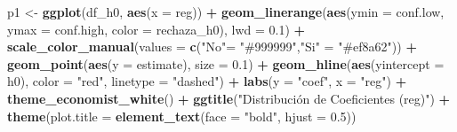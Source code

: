 \documentclass[
]{article}
\newenvironment{Shaded}{\begin{snugshade}}{\end{snugshade}}
\newcommand{\AttributeTok}[1]{\textcolor[rgb]{0.13,0.29,0.53}{#1}}
\newcommand{\FloatTok}[1]{\textcolor[rgb]{0.00,0.00,0.81}{#1}}
\newcommand{\FunctionTok}[1]{\textcolor[rgb]{0.13,0.29,0.53}{\textbf{#1}}}
\newcommand{\NormalTok}[1]{#1}
\newcommand{\OtherTok}[1]{\textcolor[rgb]{0.56,0.35,0.01}{#1}}
\newcommand{\SpecialCharTok}[1]{\textcolor[rgb]{0.81,0.36,0.00}{\textbf{#1}}}
\newcommand{\StringTok}[1]{\textcolor[rgb]{0.31,0.60,0.02}{#1}}
\begin{document}
\begin{Shaded}
\begin{Highlighting}[]
\NormalTok{p1 }\OtherTok{\textless{}{-}} \FunctionTok{ggplot}\NormalTok{(df\_h0, }\FunctionTok{aes}\NormalTok{(}\AttributeTok{x =}\NormalTok{ reg)) }\SpecialCharTok{+}
  \FunctionTok{geom\_linerange}\NormalTok{(}\FunctionTok{aes}\NormalTok{(}\AttributeTok{ymin =}\NormalTok{ conf.low, }\AttributeTok{ymax =}\NormalTok{ conf.high, }\AttributeTok{color =}\NormalTok{ rechaza\_h0), }\AttributeTok{lwd =} \FloatTok{0.1}\NormalTok{) }\SpecialCharTok{+} 
  \FunctionTok{scale\_color\_manual}\NormalTok{(}\AttributeTok{values =} \FunctionTok{c}\NormalTok{(}\StringTok{"No"}\OtherTok{=} \StringTok{"\#999999"}\NormalTok{,}\StringTok{"Si"} \OtherTok{=} \StringTok{"\#ef8a62"}\NormalTok{)) }\SpecialCharTok{+}
  \FunctionTok{geom\_point}\NormalTok{(}\FunctionTok{aes}\NormalTok{(}\AttributeTok{y =}\NormalTok{ estimate), }\AttributeTok{size =} \FloatTok{0.1}\NormalTok{) }\SpecialCharTok{+} 
  \FunctionTok{geom\_hline}\NormalTok{(}\FunctionTok{aes}\NormalTok{(}\AttributeTok{yintercept =}\NormalTok{ h0), }\AttributeTok{color =} \StringTok{"red"}\NormalTok{, }\AttributeTok{linetype =} \StringTok{"dashed"}\NormalTok{) }\SpecialCharTok{+}
  \FunctionTok{labs}\NormalTok{(}\AttributeTok{y =} \StringTok{"coef"}\NormalTok{, }\AttributeTok{x =} \StringTok{"reg"}\NormalTok{) }\SpecialCharTok{+}
  \FunctionTok{theme\_economist\_white}\NormalTok{() }\SpecialCharTok{+}
  \FunctionTok{ggtitle}\NormalTok{(}\StringTok{"Distribución de Coeficientes (reg)"}\NormalTok{) }\SpecialCharTok{+}
  \FunctionTok{theme}\NormalTok{(}\AttributeTok{plot.title =} \FunctionTok{element\_text}\NormalTok{(}\AttributeTok{face =} \StringTok{"bold"}\NormalTok{, }\AttributeTok{hjust =} \FloatTok{0.5}\NormalTok{))}



\end{Highlighting}
\end{Shaded}
\end{document}
